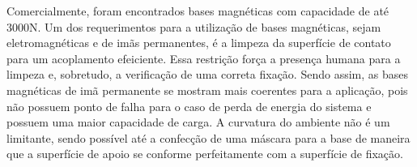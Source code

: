 Comercialmente, foram encontrados bases magnéticas com capacidade de até 3000N.
Um dos requerimentos para a utilização de bases magnéticas, sejam
eletromagnéticas e de imãs permanentes, é a limpeza da superfície de contato
para um acoplamento efeiciente. Essa restrição força a presença humana para a
limpeza e, sobretudo, a verificação de uma correta fixação. Sendo assim, as
bases magnéticas de imã permanente se mostram mais coerentes para a aplicação,
pois não possuem ponto de falha para o caso de perda de energia do sistema e
possuem uma maior capacidade de carga. A curvatura do ambiente não é um
limitante, sendo possível até a confecção de uma máscara para a base de maneira
que a superfície de apoio se conforme perfeitamente com a superfície de fixação.












